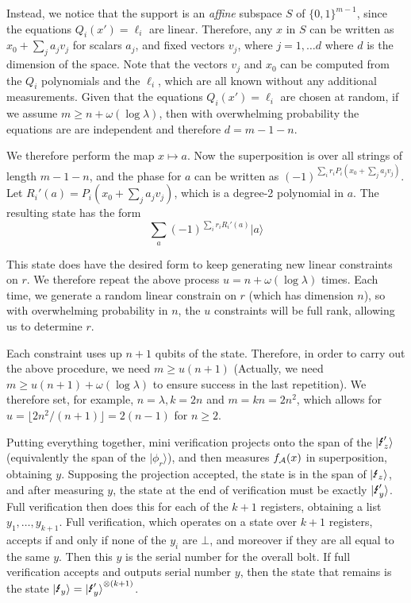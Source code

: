 Instead, we notice that the support is an \emph{affine} subspace $S$ of $\{0,1\}^{m-1}$, since the equations $Q_i(x')=\ell_i$ are linear.  Therefore, any $x$ in $S$ can be written as $x_0+\sum_j a_j v_j$ for scalars $a_j$, and fixed vectors $v_j$, where $j=1,\dots d$ where $d$ is the dimension of the space.  Note that the vectors $v_j$ and $x_0$ can be computed from the $Q_i$ polynomials and the $\ell_i$, which are all known without any additional measurements.  Given that the equations $Q_i(x')=\ell_i$ are chosen at random, if we assume $m\geq n+\omega(\log\lambda)$, then with overwhelming probability the equations are are independent and therefore $d=m-1-n$.  

We therefore perform the map $x\mapsto a$.  Now the superposition is over all strings of length $m-1-n$, and the phase for $a$ can be written as $(-1)^{\sum_i r_i P_i(x_0+\sum_j a_j v_j)}$.  Let $R_i'(a) = P_i(x_0+\sum_j a_j v_j)$, which is a degree-2 polynomial in $a$.  The resulting state has the form
\[\sum_a (-1)^{\sum_i r_i R_i'(a)}|a\rangle\]

This state does have the desired form to keep generating new linear constraints on $r$.  We therefore repeat the above process $u=n+\omega(\log \lambda)$ times.  Each time, we generate a random linear constrain on $r$ (which has dimension $n$), so with overwhelming probability in $n$, the $u$ constraints will be full rank, allowing us to determine $r$.

Each constraint uses up $n+1$ qubits of the state.  Therefore, in order to carry out the above procedure, we need $m\geq u(n+1)$ (Actually, we need $m\geq u(n+1)+\omega(\log\lambda)$ to ensure success in the last repetition).  We therefore set, for example, $n=\lambda,k=2n$ and $m=kn=2n^2$, which allows for $u=\lfloor 2n^2/(n+1)\rfloor=2(n-1)$ for $n\geq 2$.  

\medskip

Putting everything together, mini verification projects onto the span of the $\qlightningp[z]$ (equivalently the span of the $|\phi_r\rangle$), and then measures $f_{\mathcal{A}}(x)$ in superposition, obtaining $y$.  Supposing the projection accepted, the state is in the span of $\qlightning[z]$, and after measuring $y$, the state at the end of verification must be exactly $\qlightningp[y]$. Full verification then does this for each of the $k+1$ registers, obtaining a list $y_1,\dots,y_{k+1}$.   Full verification, which operates on a state over $k+1$ registers, accepts if and only if none of the $y_i$ are $\bot$, and moreover if they are all equal to the same $y$.  Then this $y$ is the serial number for the overall bolt.  If full verification accepts and outputs serial number $y$, then the state that remains is the state $\qlightning[y]=\qlightningp[y]^{\otimes (k+1)}$.



